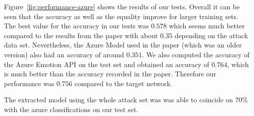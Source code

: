 \documentclass[a4paper,11pt]{article}
\begin{document}
        
        Figure~\ref{fig:performance-azure} shows the results of our tests. Overall it can be seen that the accuracy as well as the equality improve for larger training sets. The best value for the accuracy in our tests was $0.578$ which seems much better compared to the results from the paper with about $0.35$ depending on the attack data set. Nevertheless, the Azure Model used in the paper (which was an older version) also had an accuracy of around $0.351$. We also computed the accuracy of the Azure Emotion API on the test set and obtained an accuracy of $0.764$, which is much better than the accuracy recorded in the paper. Therefore our performance was $0.756$ compared to the target network.
        
        The extracted model using the whole attack set was was able to coincide on $70\%$ with the azure classifications on our test set. 
        
\end{document}
